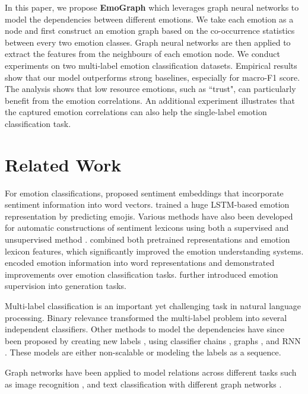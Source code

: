 \documentclass[11pt,a4paper]{article}
\begin{document}
In this paper, we propose \textbf{EmoGraph} which leverages graph neural networks to model the dependencies between different emotions. 
We take each emotion as a node and first construct an emotion graph based on the co-occurrence statistics between every two emotion classes. Graph neural networks are then applied to extract the features from the neighbours of each emotion node.
We conduct experiments on two multi-label emotion classification datasets. Empirical results show that our model outperforms strong baselines, especially for macro-F1 score. The analysis shows that low resource emotions, such as ``trust", can particularly benefit from the emotion correlations. An additional experiment illustrates that the captured emotion correlations can also help the single-label emotion classification task. 



\section{Related Work}
For emotion classifications, \citet{Tang2016} proposed sentiment embeddings that incorporate sentiment information into word vectors. \citet{felbo2017using} trained a huge LSTM-based emotion representation by predicting emojis. Various methods have also been developed for automatic constructions of sentiment lexicons using both a supervised and unsupervised method \cite{wang2017sentiment}. \citet{duppada2018seernet} combined both pretrained representations and emotion lexicon features, which significantly improved the emotion understanding systems.
\citet{park2018plusemo2vec,fung2018empathetic,xu2018emo2vec} encoded emotion information into word representations and demonstrated improvements over emotion classification tasks. \citet{shin2019happybot,lin2019moel,xu2019clickbait} further introduced emotion supervision into generation tasks.


Multi-label classification is an important yet challenging task in natural language processing. Binary relevance \cite{boutell2004learning} transformed the multi-label problem into several independent classifiers. Other methods to model the dependencies have since been proposed by creating new labels \cite{tsoumakas2007multi}, using classifier chains \cite{read2011classifier}, graphs \cite{li2015sentence}, and RNN \cite{chen2017ensemble,yang2018sgm}. These models are either non-scalable or modeling the labels as a sequence. 

Graph networks have been applied to model relations across different tasks such as image recognition \cite{chen2019multi,garcia2017few}, and text classification \cite{ghosal2019dialoguegcn,yao2019graph} with different graph networks \cite{kipf2016semi,velivckovic2017graph}.
\end{document}
